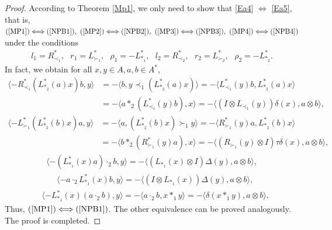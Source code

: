 \documentclass[12pt]{amsart}
\theoremstyle{definition}
\begin{document}
\begin{proof} According to Theorem \ref{Mp1}, we only need to show that \eqref{Ea4} $\Longleftrightarrow$ \eqref{Ea5}, 
that is,
 $(\ref{MP1})\Longleftrightarrow (\ref{NPB1}),~(\ref{MP2})\Longleftrightarrow (\ref{NPB2}),
~(\ref{MP3})\Longleftrightarrow (\ref{NPB3}),~(\ref{MP4})\Longleftrightarrow (\ref{NPB4})$
under the conditions
 \begin{align*}l_1=R_{\prec_1}^{*}, \ \ \ r_1=L_{\succ_1}^{*},\ \ \ \rho_1=-L_{\ast_1}^{*},\ \ \
 l_2=R_{\prec_2}^{*},\ \ \ r_2=L_{\succ_2}^{*},\ \ \ \rho_2=-L_{\ast_2}^{*}.\end{align*}
In fact, we obtain for all $x,y\in A,a,b\in A^{*}$, 
\begin{align*}
\langle -R_{\prec_1}^{*}(L_{\ast_2}^{*}(a)x)b,y\rangle
&=-\langle b,y\prec_1 (L_{\ast_2}^{*}(a)x)\rangle
=-\langle L_{\prec_1}^{*}(y)b, L_{\ast_2}^{*}(a)x\rangle
\\&=-\langle a\ast_2(L_{\prec_1}^{*}(y)b), x\rangle
=-\langle (I\otimes L_{\prec_1}(y))\delta(x),a\otimes b\rangle,\end{align*}
\begin{align*}
\langle -L_{\succ_1}^{*}(L_{\ast_2}^{*}(b)x)a,y\rangle
&=-\langle a,(L_{\ast_2}^{*}(b)x)\succ_1 y\rangle
=-\langle R_{\succ_1}^{*}(y)a, L_{\ast_2}^{*}(b)x\rangle
\\&=-\langle b\ast_2(R_{\succ_1}^{*}(y)a), x\rangle
=-\langle (R_{\succ_1}(y)\otimes I )\tau\delta(x),a\otimes b\rangle,\end{align*}
\begin{align*}\langle -(L_{\ast_1}^{*}(x)a)\cdot_2 b,y
\rangle =-\langle (L_{\ast_1}(x)\otimes I)\Delta(y),a\otimes b\rangle,
\end{align*}
\begin{align*}&
\langle -a\cdot_2 L_{\ast_1}^{*}(x)b,y\rangle=-\langle (I\otimes L_{\ast_1}(x))\Delta(y),a\otimes b\rangle,
\end{align*}
\begin{align*}&
\langle -L_{\ast_1}^{*}(x)(a\cdot_2 b),y\rangle=-\langle a\cdot_2 b,x\ast_{1}y\rangle
=-\langle \delta(x\ast_{1}y),a\otimes b\rangle.\end{align*}
Thus, $(\ref{MP1})\Longleftrightarrow (\ref{NPB1})$. The other equivalence can be proved analogously.
The proof is completed.
\end{proof}
\end{document}

